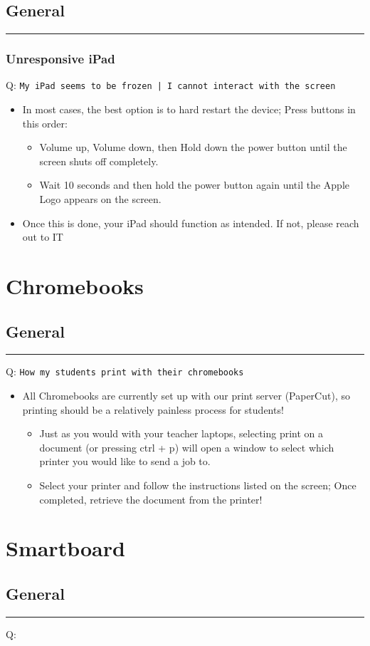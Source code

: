 \documentclass[11pt]{article}
\begin{document}
\subsection{General}
\label{sec:orge38284d}
\noindent\rule{\textwidth}{0.5pt}
\subsubsection{Unresponsive iPad}
\label{sec:org16e31b7}
Q: \texttt{My iPad seems to be frozen | I cannot interact with the screen}
\begin{itemize}
\item In most cases, the best option is to hard restart the device; Press buttons in this order:
\begin{itemize}
\item Volume up, Volume down, then Hold down the power button until the screen shuts off completely.
\item Wait 10 seconds and then hold the power button again until the Apple Logo appears on the screen.
\end{itemize}
\item Once this is done, your iPad should function as intended. If not, please reach out to IT
\end{itemize}


\clearpage
\section{Chromebooks}
\label{sec:orgfdb1c6f}
\subsection{General}
\label{sec:org3c865e3}
\noindent\rule{\textwidth}{0.5pt}
Q: \texttt{How my students print with their chromebooks}
\begin{itemize}
\item All Chromebooks are currently set up with our print server (PaperCut), so printing should be a relatively painless process for students!
\begin{itemize}
\item Just as you would with your teacher laptops, selecting print on a document (or pressing ctrl + p) will open a window to select which printer you would like to send a job to.
\item Select your printer and follow the instructions listed on the screen; Once completed, retrieve the document from the printer!
\end{itemize}
\end{itemize}
\clearpage
\section{Smartboard}
\label{sec:org4940061}
\subsection{General}
\label{sec:orgffa5e46}
\noindent\rule{\textwidth}{0.5pt}
Q:
\end{document}
